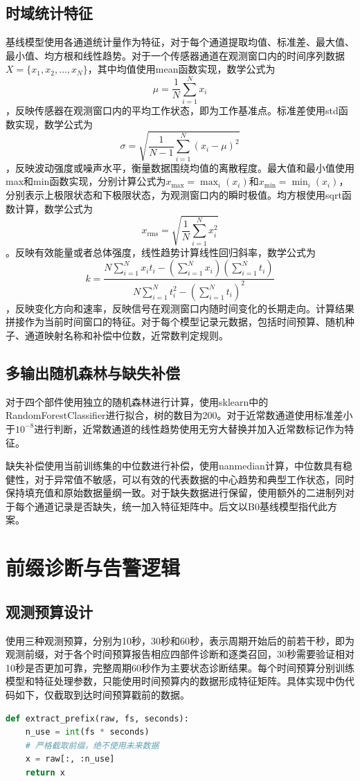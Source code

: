 \documentclass[12pt, a4paper]{ctexart}
\begin{document}
\subsection{时域统计特征}
基线模型使用各通道统计量作为特征，对于每个通道提取均值、标准差、最大值、最小值、均方根和线性趋势。对于一个传感器通道在观测窗口内的时间序列数据$X = \{x_1, x_2, \dots, x_N\}$，其中均值使用mean函数实现，数学公式为$$ \mu = \frac{1}{N} \sum_{i=1}^{N} x_i $$，反映传感器在观测窗口内的平均工作状态，即为工作基准点。标准差使用std函数实现，数学公式为$$ \sigma = \sqrt{\frac{1}{N-1} \sum_{i=1}^{N} (x_i - \mu)^2} $$，反映波动强度或噪声水平，衡量数据围绕均值的离散程度。最大值和最小值使用max和min函数实现，分别计算公式为$ x_{\max} = \max_{i} (x_i) $和$x_{\min} = \min_{i} (x_i) $，分别表示上极限状态和下极限状态，为观测窗口内的瞬时极值。均方根使用sqrt函数计算，数学公式为$$ x_{\text{rms}} = \sqrt{\frac{1}{N} \sum_{i=1}^{N} x_i^2} $$。反映有效能量或者总体强度，线性趋势计算线性回归斜率，数学公式为$$ k = \frac{N \sum_{i=1}^{N} x_i t_i - \left(\sum_{i=1}^{N} x_i\right) \left(\sum_{i=1}^{N} t_i\right)}{N \sum_{i=1}^{N} t_i^2 - \left(\sum_{i=1}^{N} t_i\right)^2} $$，反映变化方向和速率，反映信号在观测窗口内随时间变化的长期走向。计算结果拼接作为当前时间窗口的特征。对于每个模型记录元数据，包括时间预算、随机种子、通道映射名称和补偿中位数，近常数判定规则。
\subsection{多输出随机森林与缺失补偿}
对于四个部件使用独立的随机森林进行计算，使用sklearn中的RandomForestClassifier进行拟合，树的数目为200。对于近常数通道使用标准差小于$10^{-8}$进行判断，近常数通道的线性趋势使用无穷大替换并加入近常数标记作为特征。

缺失补偿使用当前训练集的中位数进行补偿，使用nanmedian计算，中位数具有稳健性，对于异常值不敏感，可以有效的代表数据的中心趋势和典型工作状态，同时保持填充值和原始数据量纲一致。对于缺失数据进行保留，使用额外的二进制列对于每个通道记录是否缺失，统一加入特征矩阵中。后文以B0基线模型指代此方案。

\section{前缀诊断与告警逻辑}
\subsection{观测预算设计}
使用三种观测预算，分别为10秒，30秒和60秒，表示周期开始后的前若干秒，即为观测前缀，对于各个时间预算报告相应四部件诊断和逐类召回，30秒需要验证相对10秒是否更加可靠，完整周期60秒作为主要状态诊断结果。每个时间预算分别训练模型和特征处理参数，只能使用时间预算内的数据形成特征矩阵。具体实现中伪代码如下，仅截取到达时间预算戳前的数据。
\begin{lstlisting}[language=Python, caption=前缀观测数据截取核心逻辑]
def extract_prefix(raw, fs, seconds):
    n_use = int(fs * seconds)
    # 严格截取前缀，绝不使用未来数据
    x = raw[:, :n_use]
    return x
\end{lstlisting}
\end{document}
